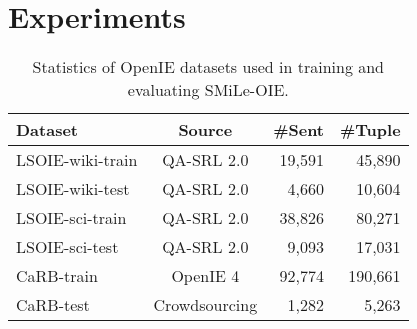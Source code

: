 \documentclass[11pt]{article}
\newcommand{\mname}{SMiLe-OIE\xspace}
\begin{document}
\section{Experiments}



\begin{table}[t]
\small
\centering
\begin{tabular}{ l|crr}
 \toprule
 Dataset & Source & \#Sent & \#Tuple\\
 \midrule
 LSOIE-wiki-train & QA-SRL 2.0 & 19,591 & 45,890 \\
 LSOIE-wiki-test & QA-SRL 2.0 & 4,660 & 10,604 \\
 \midrule
 LSOIE-sci-train & QA-SRL 2.0 & 38,826 & 80,271 \\
 LSOIE-sci-test & QA-SRL 2.0 & 9,093 & 17,031 \\
  \midrule
 CaRB-train & OpenIE 4 & 92,774 & 190,661 \\
 CaRB-test & Crowdsourcing & 1,282 & 5,263 \\
 \bottomrule
\end{tabular}
\vspace{-0.5em}
\caption{Statistics of OpenIE datasets used in training and evaluating \mname.}
\vspace{0.5em}
\label{tab:data_set}
\end{table}
\end{document}
